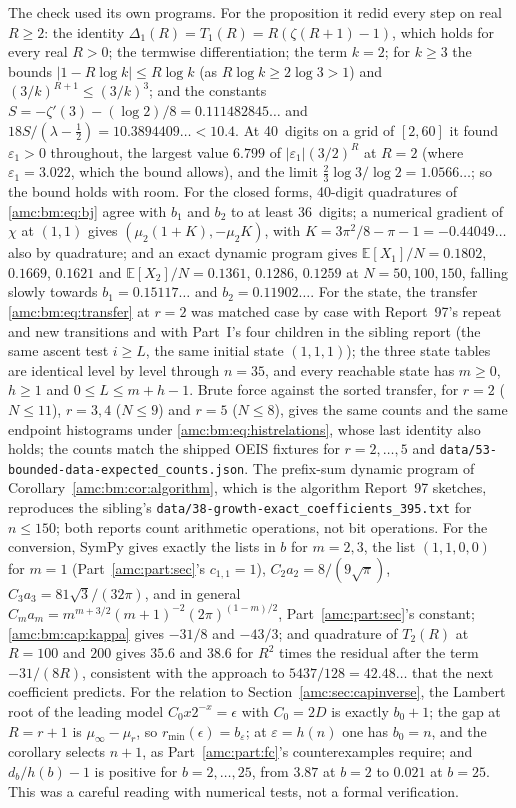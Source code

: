\documentclass[11pt,letterpaper]{article}
\theoremstyle{remark}\newtheorem{remark}[theorem]{Remark}
\newcommand{\repopath}[1]{\nolinkurl{#1}}
\begin{document}
The check used its own programs. For the proposition it redid every step
on real $R\ge2$: the identity $\Delta_1(R)=T_1(R)=R(\zeta(R+1)-1)$, which
holds for every real $R>0$; the termwise differentiation; the term $k=2$;
for $k\ge3$ the bounds $|1-R\log k|\le R\log k$ (as $R\log k\ge2\log3>1$)
and $(3/k)^{R+1}\le(3/k)^3$; and the constants
$S=-\zeta'(3)-(\log2)/8=0.111482845\ldots$ and
$18S/(\lambda-\frac12)=10.3894409\ldots<10.4$. At 40~digits on a grid of
$[2,60]$ it found $\varepsilon_1>0$ throughout, the largest value $6.799$
of $|\varepsilon_1|(3/2)^R$ at $R=2$ (where $\varepsilon_1=3.022$, which
the bound allows), and the limit $\frac23\log3/\log2=1.0566\ldots$; so the
bound holds with room. For the closed forms, 40-digit quadratures of
\eqref{amc:bm:eq:bj} agree with $b_1$ and $b_2$ to at least 36~digits; a
numerical gradient of $\chi$ at $(1,1)$ gives $(\mu_2(1+K),-\mu_2K)$, with
$K=3\pi^2/8-\pi-1=-0.44049\ldots$ also by quadrature; and an exact
dynamic program gives $\mathbb E[X_1]/N=0.1802$, $0.1669$, $0.1621$ and
$\mathbb E[X_2]/N=0.1361$, $0.1286$, $0.1259$ at $N=50,100,150$, falling
slowly towards $b_1=0.15117\ldots$ and $b_2=0.11902\ldots$. For the
state, the transfer \eqref{amc:bm:eq:transfer} at $r=2$ was matched case
by case with Report~97's repeat and new transitions and with Part~I's four
children in the sibling report (the same ascent test $i\ge L$, the same
initial state $(1,1,1)$); the three state tables are identical level by
level through $n=35$, and every reachable state has $m\ge0$, $h\ge1$ and
$0\le L\le m+h-1$. Brute force against the sorted transfer, for $r=2$
($N\le11$), $r=3,4$ ($N\le9$) and $r=5$ ($N\le8$), gives the same counts
and the same endpoint histograms under \eqref{amc:bm:eq:histrelations},
whose last identity also holds; the counts match the shipped OEIS fixtures
for $r=2,\ldots,5$ and \repopath{data/53-bounded-data-expected_counts.json}.
The prefix-sum dynamic program of Corollary~\ref{amc:bm:cor:algorithm},
which is the algorithm Report~97 sketches, reproduces the sibling's
\repopath{data/38-growth-exact_coefficients_395.txt} for $n\le150$; both
reports count arithmetic operations, not bit operations. For the
conversion, SymPy gives exactly the lists in $b$ for $m=2,3$, the list
$(1,1,0,0)$ for $m=1$ (Part~\ref{amc:part:sec}'s $c_{1,1}=1$),
$C_2a_2=8/(9\sqrt\pi)$, $C_3a_3=81\sqrt3/(32\pi)$, and in general
$C_ma_m=m^{m+3/2}(m+1)^{-2}(2\pi)^{(1-m)/2}$, Part~\ref{amc:part:sec}'s
constant; \eqref{amc:bm:cap:kappa} gives $-31/8$ and $-43/3$; and
quadrature of $T_2(R)$ at $R=100$ and $200$ gives $35.6$ and $38.6$ for
$R^2$ times the residual after the term $-31/(8R)$, consistent with the
approach to $5437/128=42.48\ldots$ that the next coefficient predicts. For
the relation to Section~\ref{amc:sec:capinverse}, the Lambert root of the
leading model $C_0x2^{-x}=\epsilon$ with $C_0=2D$ is exactly $b_0+1$; the
gap at $R=r+1$ is $\mu_\infty-\mu_r$, so $r_{\min}(\epsilon)=b_\varepsilon$;
at $\varepsilon=h(n)$ one has $b_0=n$, and the corollary selects $n+1$, as
Part~\ref{amc:part:fc}'s counterexamples require; and $d_b/h(b)-1$ is
positive for $b=2,\ldots,25$, from $3.87$ at $b=2$ to $0.021$ at $b=25$. This was a
careful reading with numerical tests, not a formal verification.
\end{document}
